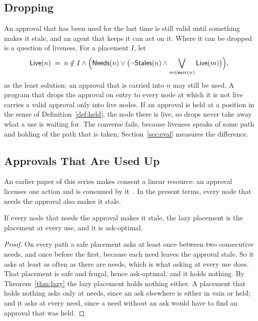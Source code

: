 \documentclass[acmsmall,nonacm,screen]{acmart}
\newcommand{\kw}[1]{\mathsf{#1}}
\newcommand{\Needs}{\kw{Needs}}
\newcommand{\Stales}{\kw{Stales}}
\newcommand{\successors}{\kw{succ}}
\begin{document}
\subsection{Dropping}

An approval that has been used for the last time is still valid until something makes it
stale, and an agent that keeps it can act on it. Where it can be dropped is a question of
liveness. For a placement $I$, let
\[ \kw{Live}(n) \;=\; n \notin I \land \Bigl(\Needs(n) \lor \bigl(\lnot\Stales(n) \land
   \bigvee_{m \in \successors(n)} \kw{Live}(m)\bigr)\Bigr), \]
as the least solution: an approval that is carried into $n$ may still be used. A program
that drops the approval on entry to every node at which it is not live carries a valid
approval only into live nodes. If an approval is held at a position in the sense of
Definition~\ref{def:held}, the node there is live, so drops never take away what a use is
waiting for. The converse fails, because liveness speaks of some path and holding of the
path that is taken; Section~\ref{sec:eval} measures the difference.

\subsection{Approvals That Are Used Up}

An earlier paper of this series makes consent a linear resource: an approval licenses one
action and is consumed by it~\cite{tpp4}. In the present terms, every node that needs the
approval also makes it stale.

\begin{corollary}
\label{cor:oneshot}
If every node that needs the approval makes it stale, the lazy placement is the placement
at every use, and it is ask-optimal.
\end{corollary}

\begin{proof}
On every path a safe placement asks at least once between two consecutive needs, and once
before the first, because each need leaves the approval stale. So it asks at least as often
as there are needs, which is what asking at every use does. That placement is safe and
frugal, hence ask-optimal, and it holds nothing. By Theorem~\ref{thm:lazy} the lazy placement
holds nothing either. A placement that holds nothing asks only at needs, since an ask
elsewhere is either in vain or held; and it asks at every need, since a need without an ask
would have to find an approval that was held.
\end{proof}
\end{document}
